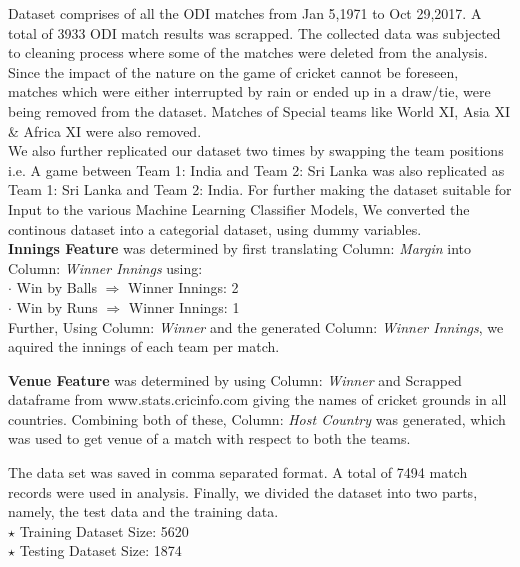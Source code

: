 \documentclass[a4paper, 10pt, conference]{IEEEtran}
\begin{document}
Dataset comprises of all the ODI matches from Jan 5,1971 to Oct 29,2017. A total of 3933 ODI match results was scrapped. The collected data was subjected to cleaning process where some of the matches were deleted from the analysis. Since the impact of the nature on the game of cricket cannot be foreseen, matches which were either interrupted by rain or ended up in a draw/tie, were being removed from the dataset. Matches of Special teams like World XI, Asia XI \& Africa XI were also removed.
\\
We also further replicated our dataset two times by swapping the team positions i.e. A game between Team 1: India and Team 2: Sri Lanka was also replicated as Team 1: Sri Lanka and Team 2: India.
For further making the dataset suitable for Input to the various Machine Learning Classifier Models, We converted the continous dataset into a categorial dataset, using dummy variables.\\

\textbf{Innings Feature} was determined by first translating Column: \textit{Margin} into Column: \textit{Winner Innings} using:
\\$\cdot$ Win by Balls $\Longrightarrow$ Winner Innings: 2
\\$\cdot$ Win by Runs $\Longrightarrow$ Winner Innings: 1
\\Further, Using Column: \textit{Winner} and the generated  Column: \textit{Winner Innings}, we aquired the innings of each team per match.

\textbf{Venue Feature} was determined by using Column: \textit{Winner} and Scrapped dataframe from www.stats.cricinfo.com giving the names of cricket grounds in all countries. Combining both of these, Column: \textit{Host Country} was generated, which was used to get venue of a match with respect to both the teams.

The data set was saved in comma separated format. A total of 7494 match records were used in analysis.  Finally, we divided the dataset into two parts, namely, the test data and the training data.
\\$\star$ Training Dataset Size: 5620
\\$\star$ Testing Dataset Size: 1874
\end{document}
